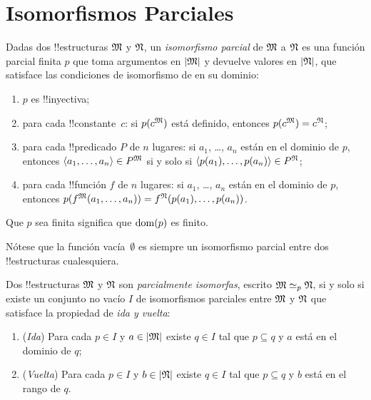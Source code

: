\documentclass[../../../include/open-logic-section]{subfiles}
\begin{document}
\section{Isomorfismos Parciales}

\begin{defn}
  Dadas dos !!{estructuras} $\Struct{M}$ y $\Struct{N}$, un \emph{isomorfismo parcial} de $\Struct{M}$ a $\Struct{N}$ es una función parcial finita $p$ que toma argumentos en $\Domain M$ y devuelve valores en $\Domain N$, que satisface las condiciones de isomorfismo de  en su dominio:
  \begin{enumerate}
  \item $p$ es !!{inyectiva};
  \item para cada !!{constante}~$c$: si $p(\Assign{c}{M})$ está definido, entonces $p(\Assign{c}{M}) = \Assign{c}{N}$;
  \item para cada !!{predicado} $P$ de $n$ lugares: si $a_1$, \dots, $a_n$ están en el dominio de $p$, entonces $\langle a_1, \dots, a_n\rangle \in \Assign P M$ si y solo si $\langle p(a_1), \dots, p(a_n) \rangle \in \Assign P N$;
  \item para cada !!{función} $f$ de $n$ lugares: si $a_1$, \dots, $a_n$ están en el dominio de $p$, entonces $p(\Assign f M (a_1, \dots,a_n)) = \Assign f N (p(a_1), \dots, p(a_n))$.
  \end{enumerate}
  Que $p$ sea finita significa que $\mathrm{dom}(p)$ es finito.
\end{defn}

Nótese que la función vacía~$\emptyset$ es siempre un isomorfismo parcial entre dos !!{estructuras} cualesquiera.

\begin{defn}
  Dos !!{estructuras} $\Struct{M}$ y $\Struct{N}$ son \emph{parcialmente isomorfas}, escrito $\Struct{M} \iso[p] \Struct{N}$, si y solo si existe un conjunto no vacío $I$ de isomorfismos parciales entre $\Struct{M}$ y $\Struct{N}$ que satisface la propiedad de \emph{ida y vuelta}:
  \begin{enumerate}
  \item (\emph{Ida}) Para cada $p \in I$ y $a \in \Domain M$ existe $q \in I$ tal que $p \subseteq q$ y $a$ está en el dominio de $q$;
  \item (\emph{Vuelta}) Para cada $p \in I$ y $b \in \Domain N$ existe $q \in I$ tal que $p \subseteq q$ y $b$ está en el rango de $q$.
  \end{enumerate}
\end{defn}
\end{document}
